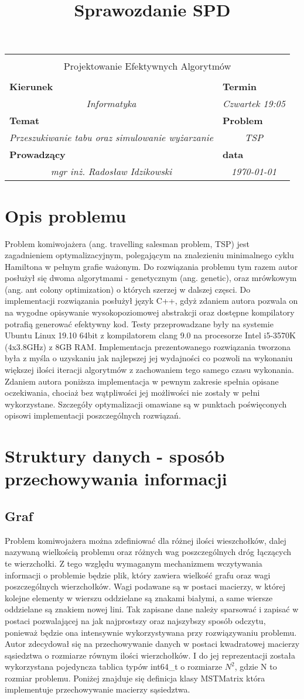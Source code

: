 \documentclass[polish,polish,a4paper]{article}
\title{Sprawozdanie SPD}
\newcommand{\name}[1]{\sffamily\bfseries\scriptsize #1}
\newcommand{\frontpage}[8]{

\vspace{2cm}

\begin{tabular}{|p{0.72\textwidth}|p{0.28\textwidth}|}
\hline
\multicolumn{2}{|c|}{}\\
\multicolumn{2}{|c|}{{\LARGE #1}}\\
\multicolumn{2}{|c|}{}\\
\hline
\name{Kierunek} & \name{Termin}\\
\multicolumn{1}{|c|}{\textit{#2}} & \multicolumn{1}{|c|}{\textit{#3}} \\
\hline
\name{Temat} & \name{Problem}\\
\multicolumn{1}{|c|}{\textit{#4}} & \multicolumn{1}{|c|}{\textit{#5}} \\
\hline
\name{Prowadzący} & \name{data}\\
\multicolumn{1}{|c|}{\textit{mgr inż. Radosław Idzikowski}} & \multicolumn{1}{|c|}{\textit{#6}} \\
\hline
\end{tabular}

}
\begin{document}
\frontpage{Projektowanie Efektywnych Algorytmów}{Informatyka}{Czwartek 19:05}{Przeszukiwanie tabu oraz simulowanie wyżarzanie}{TSP}{\today}
\pagestyle{empty}
\newpage

\section{Opis problemu}

Problem komiwojażera (ang. travelling salesman problem, TSP) jest zagadnieniem optymalizacyjnym, polegającym na znalezieniu minimalnego cyklu Hamiltona w pełnym grafie ważonym. Do rozwiązania problemu tym razem autor posłużył się dwoma algorytmami - genetycznym (ang. genetic), oraz mrówkowym
(ang. ant colony optimization) o których szerzej w dalszej częsci.
Do implementacji rozwiązania posłużył język C++, gdyż zdaniem autora pozwala on na wygodne opisywanie wysokopoziomowej abstrakcji oraz dostępne kompilatory
potrafią generować efektywny kod. Testy przeprowadzane były na systemie Ubuntu Linux 19.10 64bit z kompilatorem clang 9.0 na procesorze Intel i5-3570K (4x3.8GHz) z 8GB RAM. Implementacja prezentowanego rozwiązania tworzona była z myśla o uzyskaniu jak najlepszej jej wydajności co pozwoli na wykonaniu
większej ilości iteracji algorytmów z zachowaniem tego samego czasu wykonania.
Zdaniem autora poniższa implementacja w pewnym zakresie spełnia opisane oczekiwania, chociaż bez wątpliwości jej możliwości nie zostały w pełni
wykorzystane. Szczegóły optymalizacji omawiane są w punktach poświęconych opisowi implementacji poszczególnych rozwiązań.

\section{Struktury danych - sposób przechowywania informacji}

\subsection{Graf}

Problem komiwojażera można zdefiniować dla różnej ilości wieszchołków, dalej nazywaną wielkością problemu oraz różnych wag poszczególnych dróg łączących te wierzchołki.
Z tego względu wymaganym mechanizmem wczytywania informacji o problemie będzie plik, który zawiera wielkość grafu oraz wagi poszczególnych wierzchołków.
Wagi podawane są w postaci macierzy, w której kolejne elementy w wierszu oddzielane są znakami białymi, a same wiersze oddzielane są znakiem nowej lini.
Tak zapisane dane należy sparsować i zapisać w postaci pozwalającej na jak najprostszy oraz najszybszy sposób odczytu, ponieważ będzie ona intensywnie wykorzystywana przy rozwiązywaniu problemu.
Autor zdecydował się na przechowywanie danych w postaci kwadratowej macierzy sąsiedztwa o rozmiarze równym ilości wierzchołków.
I do jej reprezentacji została wykorzystana pojedyncza tablica typów int64\_t o rozmiarze $N^{2}$, gdzie N to rozmiar problemu.
Poniżej znajduje się definicja klasy MSTMatrix która implementuje przechowywanie macierzy sąsiedztwa.
\end{document}
